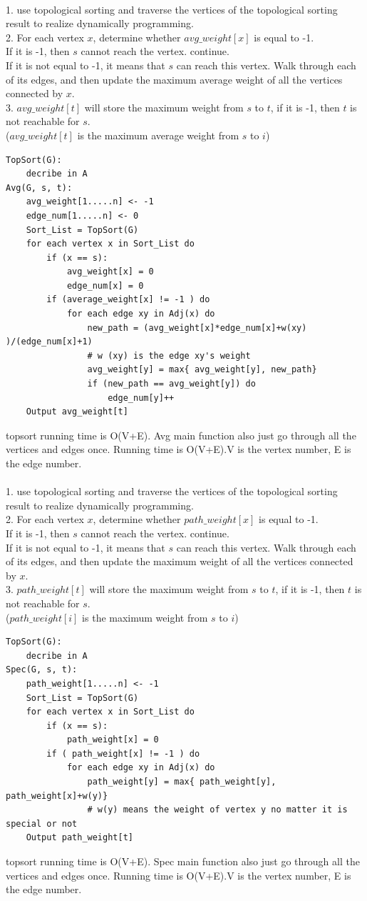 \documentclass[12pt,a4paper]{article}
\newcommand{\question}[1]{\bigskip\noindent{\textbf{Q{#1} solution}}}
\begin{document}
\question{23.B}\\
1. use topological sorting and traverse the vertices of the topological sorting result to realize dynamically programming.
\\2. For each vertex $x$, determine whether $avg\_weight[x]$ is equal to -1. 
\\If it is -1, then $s$ cannot reach the vertex. continue.
\\If it is not equal to -1, it means that $s$ can reach this vertex. Walk through each of its edges, and then update the maximum average weight of all the vertices connected by $x$.
\\3. $avg\_weight[t]$ will store the maximum weight from $s$ to $t$, if it is -1, then $t$ is not reachable for $s$.
\\($avg\_weight[t]$ is the maximum average weight from $s$ to $i$)
\begin{lstlisting}
TopSort(G):
	decribe in A
Avg(G, s, t):
	avg_weight[1.....n] <- -1
	edge_num[1.....n] <- 0
	Sort_List = TopSort(G)
	for each vertex x in Sort_List do
		if (x == s):
			avg_weight[x] = 0
			edge_num[x] = 0
		if (average_weight[x] != -1 ) do
			for each edge xy in Adj(x) do
				new_path = (avg_weight[x]*edge_num[x]+w(xy) )/(edge_num[x]+1)
				# w (xy) is the edge xy's weight
				avg_weight[y] = max{ avg_weight[y], new_path}
				if (new_path == avg_weight[y]) do
					edge_num[y]++
	Output avg_weight[t]
\end{lstlisting}
topsort running time is O(V+E). Avg main function also just go through all the vertices and edges once. Running time is O(V+E).V is the vertex number, E is the edge number.\\


\question{23.C}\\
1. use topological sorting and traverse the vertices of the topological sorting result to realize dynamically programming.
\\2. For each vertex $x$, determine whether $path\_weight[x]$ is equal to -1. 
\\If it is -1, then $s$ cannot reach the vertex. continue.
\\If it is not equal to -1, it means that $s$ can reach this vertex. Walk through each of its edges, and then update the maximum weight of all the vertices connected by $x$.
\\3. $path\_weight[t]$ will store the maximum weight from $s$ to $t$, if it is -1, then $t$ is not reachable for $s$.
\\($path\_weight[i]$ is the maximum weight from $s$ to $i$)
\begin{lstlisting}
TopSort(G):
	decribe in A
Spec(G, s, t):
	path_weight[1.....n] <- -1
	Sort_List = TopSort(G)
	for each vertex x in Sort_List do
		if (x == s):
			path_weight[x] = 0
		if ( path_weight[x] != -1 ) do
			for each edge xy in Adj(x) do
				path_weight[y] = max{ path_weight[y], path_weight[x]+w(y)}
				# w(y) means the weight of vertex y no matter it is special or not
	Output path_weight[t]
\end{lstlisting}
topsort running time is O(V+E). Spec main function also just go through all the vertices and edges once. Running time is O(V+E).V is the vertex number, E is the edge number.\\
\end{document}
